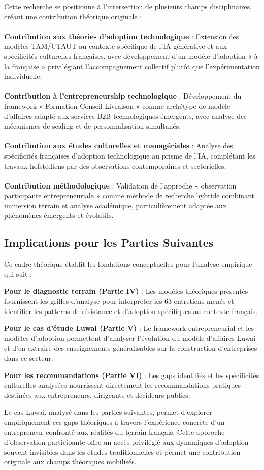 Cette recherche se positionne à l'intersection de plusieurs champs disciplinaires, créant une contribution théorique originale :
\\\\
\textbf{Contribution aux théories d'adoption technologique} : Extension des modèles TAM/UTAUT au contexte spécifique de l'IA générative et aux spécificités culturelles françaises, avec développement d'un modèle d'adoption « à la française » privilégiant l'accompagnement collectif plutôt que l'expérimentation individuelle.
\\\\
\textbf{Contribution à l'entrepreneurship technologique} : Développement du framework « Formation-Conseil-Livraison » comme archétype de modèle d'affaires adapté aux services B2B technologiques émergents, avec analyse des mécanismes de scaling et de personnalisation simultanés.
\\\\
\textbf{Contribution aux études culturelles et managériales} : Analyse des spécificités françaises d'adoption technologique au prisme de l'IA, complétant les travaux hofstédiens par des observations contemporaines et sectorielles.
\\\\
\textbf{Contribution méthodologique} : Validation de l'approche « observation participante entrepreneuriale » comme méthode de recherche hybride combinant immersion terrain et analyse académique, particulièrement adaptée aux phénomènes émergents et évolutifs.

\subsection{Implications pour les Parties Suivantes}

Ce cadre théorique établit les fondations conceptuelles pour l'analyse empirique qui suit :

\textbf{Pour le diagnostic terrain (Partie IV)} : Les modèles théoriques présentés fournissent les grilles d'analyse pour interpréter les 63 entretiens menés et identifier les patterns de résistance et d'adoption spécifiques au contexte français.

\textbf{Pour le cas d'étude Luwai (Partie V)} : Le framework entrepreneurial et les modèles d'adoption permettent d'analyser l'évolution du modèle d'affaires Luwai et d'en extraire des enseignements généralisables sur la construction d'entreprises dans ce secteur.

\textbf{Pour les recommandations (Partie VI)} : Les gaps identifiés et les spécificités culturelles analysées nourrissent directement les recommandations pratiques destinées aux entrepreneurs, dirigeants et décideurs publics.

Le cas Luwai, analysé dans les parties suivantes, permet d'explorer empiriquement ces gaps théoriques à travers l'expérience concrète d'un entrepreneur confronté aux réalités du terrain français. Cette approche d'observation participante offre un accès privilégié aux dynamiques d'adoption souvent invisibles dans les études traditionnelles et permet une contribution originale aux champs théoriques mobilisés.
